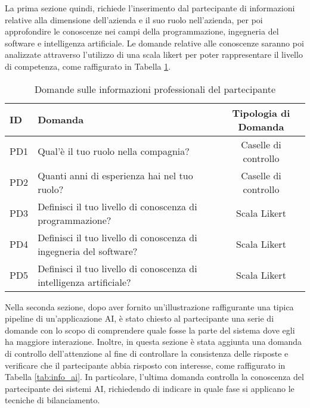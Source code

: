 La prima sezione quindi, richiede l'inserimento dal partecipante di informazioni relative alla dimensione dell'azienda e il suo ruolo nell'azienda, per poi approfondire le conoscenze nei campi della programmazione, ingegneria del software e intelligenza artificiale. Le domande relative alle conoscenze saranno poi analizzate attraverso l'utilizzo di una scala likert per poter rappresentare il livello di competenza, come raffigurato in Tabella \ref{tab:info_prof}.
\begin{table}[h!]
    \centering
    \begin{tabular}{|l|p{7cm}|c|}
        \hline
        \textbf{ID} & \textbf{Domanda} & \textbf{Tipologia di Domanda}\\
        \hline
        \hline
        PD1 & Qual'è il tuo ruolo nella compagnia?  & Caselle di controllo\\
        \hline
        PD2 & Quanti anni di esperienza hai nel tuo ruolo?  & Caselle di controllo\\
        \hline
        PD3 & Definisci il tuo livello di conoscenza di programmazione?  & Scala Likert\\
        \hline
        PD4 & Definisci il tuo livello di conoscenza di ingegneria del software?  & Scala Likert\\
        \hline
        PD5 & Definisci il tuo livello di conoscenza di intelligenza artificiale?  & Scala Likert\\
        \hline
    \end{tabular}
    \caption{Domande sulle informazioni professionali del partecipante}
    \label{tab:info_prof}
\end{table}
Nella seconda sezione, dopo aver fornito un'illustrazione raffigurante una tipica pipeline di un'applicazione AI, è stato chiesto al partecipante una serie di domande con lo scopo di comprendere quale fosse la parte del sistema dove egli ha maggiore interazione.
Inoltre, in questa sezione è stata aggiunta una domanda di controllo dell'attenzione al fine di controllare la consistenza delle risposte e verificare che il partecipante abbia risposto con interesse, come raffigurato in Tabella \ref{tab:info_ai}.
In particolare, l'ultima domanda controlla la conoscenza del partecipante dei sistemi AI, richiedendo di indicare in quale fase si applicano le tecniche di bilanciamento.


